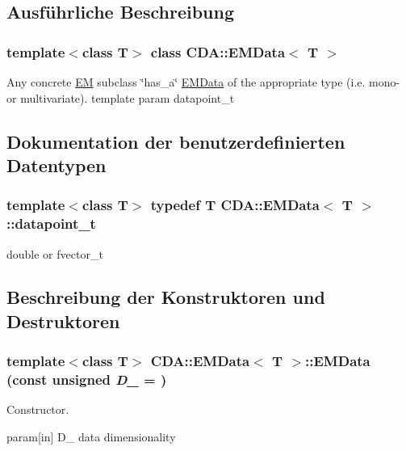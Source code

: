 \subsection{Ausführliche Beschreibung}
\subsubsection*{template$<$class T$>$ class CDA::EMData$<$ T $>$}

Any concrete \hyperlink{classCDA_1_1EM}{EM} subclass \char`\"{}has\_\-a\char`\"{} \hyperlink{classCDA_1_1EMData}{EMData} of the appropriate type (i.e. mono-\/ or multivariate). template param datapoint\_\-t 

\subsection{Dokumentation der benutzerdefinierten Datentypen}
\hypertarget{classCDA_1_1EMData_a320dfbd3ad13091a99602a140688a05d}{
\subsubsection[{datapoint\_\-t}]{\setlength{\rightskip}{0pt plus 5cm}template$<$class T$>$ typedef T {\bf CDA::EMData}$<$ T $>$::{\bf datapoint\_\-t}}}
\label{classCDA_1_1EMData_a320dfbd3ad13091a99602a140688a05d}
double or fvector\_\-t 

\subsection{Beschreibung der Konstruktoren und Destruktoren}
\hypertarget{classCDA_1_1EMData_ae81ba273dcb87842699fcc1f6bd7b62a}{
\subsubsection[{EMData}]{\setlength{\rightskip}{0pt plus 5cm}template$<$class T$>$ {\bf CDA::EMData}$<$ T $>$::{\bf EMData} (const unsigned {\em D\_\-} = {})}}
\label{classCDA_1_1EMData_ae81ba273dcb87842699fcc1f6bd7b62a}


Constructor. 

param\mbox{[}in\mbox{]} D\_\- data dimensionality 

